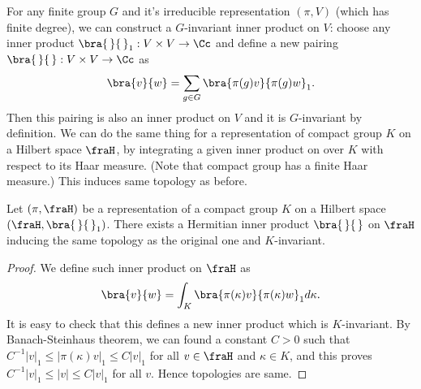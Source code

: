 For any finite group $G$ and it's irreducible representation $(\pi, V)$ (which has finite degree), we can construct a $G$-invariant inner product on $V$: choose any inner product  $\bra{\,}{\,}_{1}:V\times V\to \Cc$ and define a new pairing $\bra{\,}{\,}:V\times V \to \Cc$ as 
$$
\bra{v}{w} = \sum_{g\in G} \bra{\pi(g)v}{\pi(g)w}_{1}.
$$
Then this pairing is also an inner product on $V$ and it is $G$-invariant by definition. We can do the same thing for a representation of compact group $K$ on a Hilbert space $\fraH$,  by integrating a given inner product on over $K$ with respect to its Haar measure. (Note that compact group has a finite Haar measure.) This induces same topology as before. 
\begin{lemma}
Let $(\pi, \fraH)$ be a representation of a compact group $K$ on a Hilbert space $(\fraH, \bra{\,}{\,}_{1})$. 
There exists a Hermitian inner product $\bra{\,}{\,}$ on $\fraH$ inducing the same topology as the original one and $K$-invariant. 
\end{lemma}
\begin{proof}
We define such inner product on $\fraH$ as 
$$
\bra{v}{w} = \int_{K} \bra{\pi(\kappa)v}{\pi(\kappa)w}_{1}d\kappa. 
$$
It is easy to check that this defines a new inner product which is $K$-invariant. By Banach-Steinhaus theorem,  we can found a constant $C>0$ such that $C^{-1}|v|_{1} \leq |\pi(\kappa)v|_{1} \leq C|v|_{1}$ for all $v\in \fraH$ and $\kappa \in K$, and this proves $C^{-1}|v|_{1} \leq |v| \leq C|v|_{1}$ for all $v$. Hence topologies are same. 
\end{proof}


